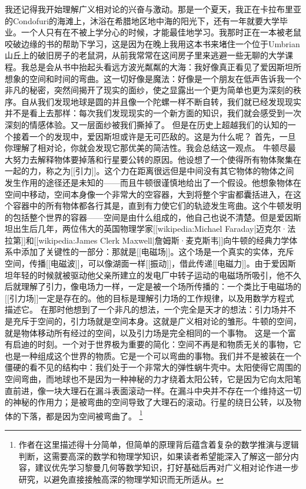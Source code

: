     我还记得我开始理解广义相对论的兴奋与激动。那是一个夏天，我正在卡拉布里亚的Condofuri的海滩上，沐浴在希腊地区地中海的阳光下，还有一年就要大学毕业。一个人只有在不被上学分心的时候，才能最佳地学习。我那时正在一本被老鼠咬破边缘的书的帮助下学习，这是因为在晚上我用这本书来堵住一个位于Umbrian山丘上的破旧房子的老鼠洞，从前我常常在这间房子里来逃避一些无聊的大学课程。我总是会从书中抬起头看远方波光粼粼的大海：我好像真正看见了爱因斯坦所想象的空间和时间的弯曲。这一切好像是魔法：好像是一个朋友在低声告诉我一个非凡的秘密，突然间揭开了现实的面纱，使之显露出一个更为简单也更为深刻的秩序。自从我们发现地球是圆的并且像一个陀螺一样不断自转，我们就已经发现现实并不是看上去那样：每次我们发现现实的一个新方面的知识，我们就会感受到一次深刻的情感体验。又一层面纱被我们撕掉了。
    但是在历史上超越我们的认知的一个接着一个的发现中，爱因斯坦或许是无可匹敌的。这是为什么呢？
    首先，一旦你理解了相对论，你就会发现它那优美的简洁性。我会总结这一观点。
    牛顿尽最大努力去解释物体要掉落和行星要公转的原因。他设想了一个使得所有物体聚集在一起的力，称之为[[引力]]。这个力在距离很远但是中间没有其它物体的物体之间发生作用的途径还是未知的——而且牛顿很谨慎地给出了一个假设。他想象物体在空间中移动，空间本身像一个非常大的空容器，大到将整个宇宙都囊括进入，在这个容器中的所有物体都各行其是，直到有力使它们的轨迹发生弯曲。这个牛顿发明的包括整个世界的容器——空间是由什么组成的，他自己也说不清楚。但是爱因斯坦出生后几年，两位伟大的英国物理学家[[wikipedia:Michael Faraday|迈克尔·法拉第]]和[[wikipedia:James Clerk Maxwell|詹姆斯·麦克斯韦]]向牛顿的经典力学体系中添加了关键性的一部分：那就是[[电磁场]]。这个场是一个真实的实体，充斥空间，传播[[电磁波]]，可以像湖面一样[[振动]]，借此传递[[电磁力]]。由于爱因斯坦年轻的时候就被驱动他父亲所建立的发电厂中转子运动的电磁场所吸引，他不久后就理解了引力，像电场力一样，一定是被一个场所传播的：一个类比于电磁场的[[引力场]]一定是存在的。他的目标是理解引力场的工作规律，以及用数学方程式描述它。
    在那时他想到了一个非凡的想法，一个完全是天才的想法：引力场并不是充斥于空间的，引力场就是空间本身。这就是广义相对论的雏形。牛顿的空间，就是物体移动所有经过的空间，以及引力场是完全相同的一个事物。
    这是一个富有启迪的时刻。一个对于世界极为重要的简化：空间不再是和物质无关的事物，它也是一种组成这个世界的物质。它是一个可以弯曲的事物。我们并不是被装在一个僵硬的看不见的结构中：我们处于一个非常大的弹性蜗牛壳中。太阳使得它周围的空间弯曲，而地球也不是因为一种神秘的力才绕着太阳公转，它是因为它向太阳笔直前进，像一块大理石在漏斗表面滚动一样。在漏斗中央并不存在一个维持这一切的神秘的作用力；是被弯曲的空间导致了大理石的滚动。行星的绕日公转，以及物体的下落，都是因为空间被弯曲了。
\footnote[3]
{
作者在这里描述得十分简单，但简单的原理背后蕴含着复杂的数学推演与逻辑判断，这需要高深的数学和物理学知识，如果读者希望能深入了解这一部分内容，建议优先学习黎曼几何等数学知识，打好基础后再对广义相对论作进一步研究，以避免直接接触高深的物理学知识而无所适从。
}
